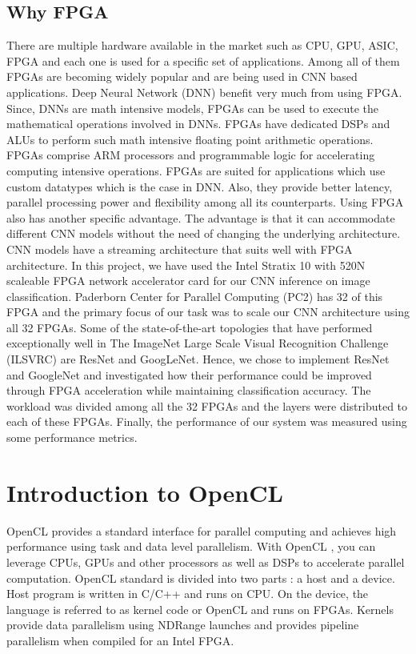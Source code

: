 \section{Why FPGA}
There are multiple hardware available in the market such as CPU, GPU, ASIC, FPGA and each one is used for a specific set of applications. Among all of them FPGAs are becoming widely popular and are being used in CNN based applications. Deep Neural Network (DNN) benefit very much from using FPGA. Since, DNNs are math intensive models, FPGAs can be used to execute the mathematical operations involved in DNNs. FPGAs have dedicated DSPs and ALUs to perform such math intensive floating point arithmetic operations. FPGAs comprise ARM processors and programmable logic for accelerating computing intensive operations. FPGAs are suited for applications which use custom datatypes which is the case in DNN. Also, they provide better latency, parallel processing power and flexibility among all its counterparts. Using FPGA also has another specific advantage. The advantage is that it can accommodate different CNN models without the need of changing the underlying architecture. CNN models have a streaming architecture that suits well with FPGA architecture.
In this project, we have used the Intel Stratix 10 with 520N scaleable FPGA network accelerator card for our CNN inference on image classification. Paderborn Center for Parallel Computing (PC2) has 32 of this FPGA and the primary focus of our task was to scale our CNN architecture using all 32 FPGAs.
Some of the state-of-the-art topologies that have performed exceptionally well in The ImageNet Large Scale Visual Recognition Challenge (ILSVRC) are ResNet and GoogLeNet. Hence, we chose to implement ResNet and GoogleNet and investigated how their performance could be improved through FPGA acceleration while maintaining classification accuracy.
The workload was divided among all the 32 FPGAs and the layers were distributed to each of these FPGAs. Finally, the performance of our system was measured using some performance metrics.

\chapter{Introduction to OpenCL}
OpenCL provides a standard interface for parallel computing and achieves high performance using task and data level parallelism. With OpenCL , you can leverage CPUs, GPUs and other processors as well as DSPs to accelerate parallel computation. OpenCL standard is divided into two parts : a host and a device. Host program is written in C/C++ and runs on CPU. On the device, the language is referred to as kernel code or OpenCL and runs on FPGAs. Kernels provide data parallelism using NDRange launches and provides pipeline parallelism when compiled for an Intel FPGA.
